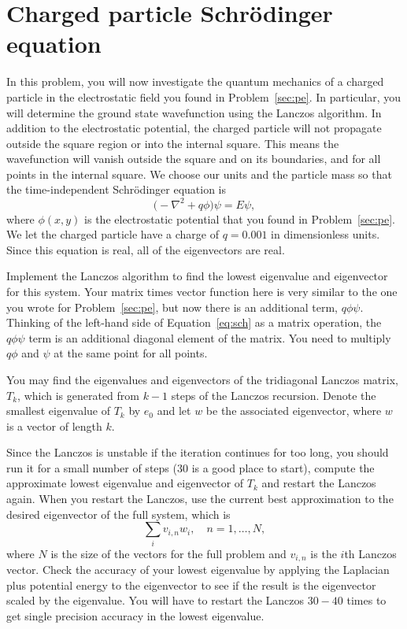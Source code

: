 \section{Charged particle Schrödinger equation}

In this problem, you will now investigate the quantum mechanics of a charged particle in the
electrostatic field you found in Problem~\ref{sec:pe}. In particular, you will determine the
ground state wavefunction using the Lanczos algorithm. In addition to the electrostatic
potential, the charged particle will not propagate outside the square region or into the
internal square. This means the wavefunction will vanish outside the square and on its
boundaries, and for all points in the internal square. We choose our units and the particle
mass so that the time-independent Schrödinger equation is
%
\begin{equation}\label{eq:sch}
    \bigl( -\nabla^2 + q \phi \bigr) \psi = E \psi,
\end{equation}
%
where \(\phi(x, y)\) is the electrostatic potential that you found in Problem~\ref{sec:pe}.
We let the charged particle have a charge of \(q = 0.001\) in dimensionless units. Since
this equation is real, all of the eigenvectors are real.

Implement the Lanczos algorithm to find the lowest eigenvalue and eigenvector for this
system. Your matrix times vector function here is very similar to the one you wrote for
Problem~\ref{sec:pe}, but now there is an additional term, \(q \phi \psi\).
Thinking of the left-hand side of Equation~\eqref{eq:sch}
as a matrix operation, the \(q \phi \psi\) term is an additional diagonal element of the
matrix. You need to multiply \(q \phi\) and \(\psi\) at the same point for all points.

You may find the eigenvalues and eigenvectors of the tridiagonal Lanczos matrix, \(T_k\),
which is generated from \(k - 1\) steps of the Lanczos recursion. Denote the smallest
eigenvalue of \(T_k\) by \(e_0\) and let \(w\) be the associated eigenvector, where \(w\) is
a vector of length \(k\).

Since the Lanczos is unstable if the iteration continues for too long, you should run it for
a small number of steps (\(30\) is a good place to start), compute the approximate lowest
eigenvalue and eigenvector of \(T_k\) and restart the Lanczos again. When you restart the
Lanczos, use the current best approximation to the desired eigenvector of the full system,
which is
%
\begin{equation}
    \sum_i v_{i, n} w_i, \quad n = 1, \ldots, N,
\end{equation}
%
where \(N\) is the size of the vectors for the full problem and \(v_{i, n}\) is the \(i\)th
Lanczos vector. Check the accuracy of your lowest eigenvalue by applying the Laplacian plus
potential energy to the eigenvector to see if the result is the eigenvector scaled by the
eigenvalue. You will have to restart the Lanczos \(30 - 40\) times to get single precision
accuracy in the lowest eigenvalue.


